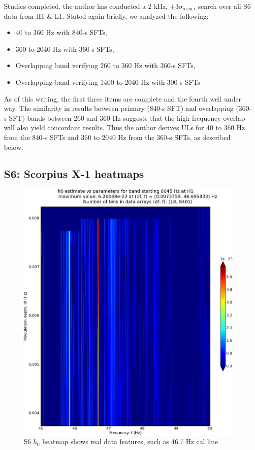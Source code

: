 Studies completed, the author has conducted a 2 kHz, $\pm 3 \sigma_{a \sin i}$ search over all S6 data from H1 \& L1.
Stated again briefly, we analyzed the following:
\begin{itemize}
\item 40 to 360 Hz with 840-s SFTs,
\item 360 to 2040 Hz with 360-s SFTs,
\item Overlapping band verifying 260 to 360 Hz with 360-s SFTs,
\item Overlapping band verifying 1400 to 2040 Hz with 300-s SFTs
\end{itemize}
As of this writing, the first three items are complete and the fourth well under way.
The similarity in results between primary (840-s SFT) and overlapping (360-s SFT) bands between 260 and 360 Hz suggests that the high frequency overlap will also yield concordant results.
Thus the author derives ULs for 40 to 360 Hz from the 840-s SFTs and 360 to 2040 Hz from the 360-s SFTs, as described below.

\subsection{S6: Scorpius X-1 heatmaps}

\begin{figure}
\begin{center}
\includegraphics[width=0.68\paperwidth,height=0.48\paperheight]{plots/DFvsFresultsh0-H1_pulsar-0045.eps}
\caption{
S6 $h_0$ heatmap shows real data features, such as 46.7 Hz cal line}
\label{S6_cal_line_heatmap}
\end{center}
\end{figure}

